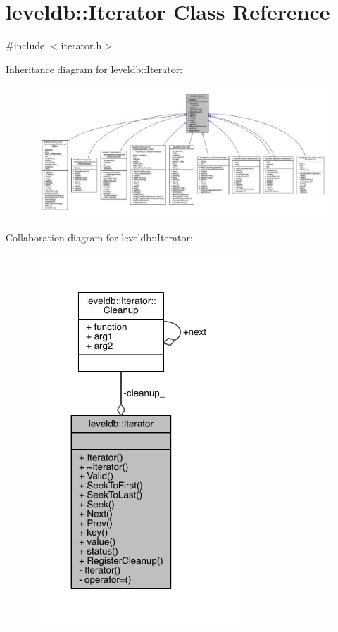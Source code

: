 \hypertarget{classleveldb_1_1_iterator}{}\section{leveldb\+:\+:Iterator Class Reference}
\label{classleveldb_1_1_iterator}


{\ttfamily \#include $<$iterator.\+h$>$}



Inheritance diagram for leveldb\+:\+:Iterator\+:
\nopagebreak
\begin{figure}[H]
\begin{center}
\leavevmode
\includegraphics[width=350pt]{classleveldb_1_1_iterator__inherit__graph}
\end{center}
\end{figure}


Collaboration diagram for leveldb\+:\+:Iterator\+:\nopagebreak
\begin{figure}[H]
\begin{center}
\leavevmode
\includegraphics[width=224pt]{classleveldb_1_1_iterator__coll__graph}
\end{center}
\end{figure}
